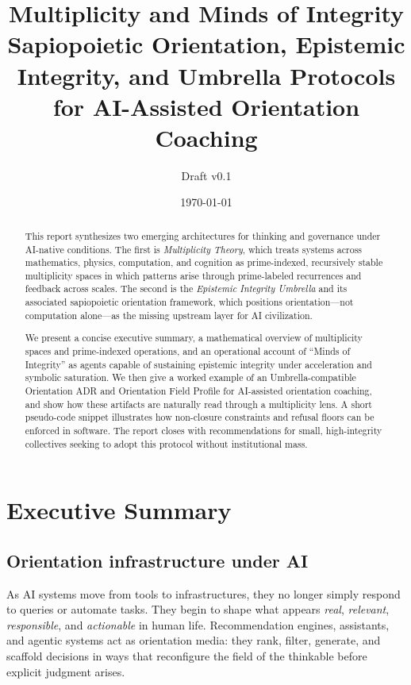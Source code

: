 \documentclass[11pt]{article}
\title{Multiplicity and Minds of Integrity\\
\vspace{0.25em}
\large Sapiopoietic Orientation, Epistemic Integrity, and Umbrella Protocols for AI-Assisted Orientation Coaching}
\author{Draft v0.1}
\date{\today}
\begin{document}
\maketitle
\onehalfspacing

\begin{abstract}
This report synthesizes two emerging architectures for thinking and governance under AI-native conditions. The first is \emph{Multiplicity Theory}, which treats systems across mathematics, physics, computation, and cognition as prime-indexed, recursively stable multiplicity spaces in which patterns arise through prime-labeled recurrences and feedback across scales. The second is the \emph{Epistemic Integrity Umbrella} and its associated sapiopoietic orientation framework, which positions orientation---not computation alone---as the missing upstream layer for AI civilization.

We present a concise executive summary, a mathematical overview of multiplicity spaces and prime-indexed operations, and an operational account of ``Minds of Integrity'' as agents capable of sustaining epistemic integrity under acceleration and symbolic saturation. We then give a worked example of an Umbrella-compatible Orientation ADR and Orientation Field Profile for AI-assisted orientation coaching, and show how these artifacts are naturally read through a multiplicity lens. A short pseudo-code snippet illustrates how non-closure constraints and refusal floors can be enforced in software. The report closes with recommendations for small, high-integrity collectives seeking to adopt this protocol without institutional mass.
\end{abstract}
\newpage
\tableofcontents

\newpage

\section{Executive Summary}

\subsection{Orientation infrastructure under AI}

As AI systems move from tools to infrastructures, they no longer simply respond to queries or automate tasks. They begin to shape what appears \emph{real}, \emph{relevant}, \emph{responsible}, and \emph{actionable} in human life. Recommendation engines, assistants, and agentic systems act as orientation media: they rank, filter, generate, and scaffold decisions in ways that reconfigure the field of the thinkable before explicit judgment arises.
\end{document}
